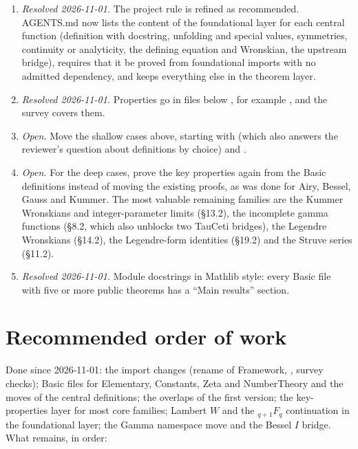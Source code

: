 \documentclass[11pt,a4paper]{article}
\newcommand{\resolved}[1]{\textit{Resolved #1.}}
\newcommand{\open}{\textit{Open.}}
\begin{document}
\begin{enumerate}
  \item \resolved{2026-11-01} The project rule is refined as recommended. AGENTS.md now lists
    the content of the foundational layer for each central function (definition with
    docstring, unfolding and special values, symmetries, continuity or analyticity, the
    defining equation and Wronskian, the upstream bridge), requires that it be proved from
    foundational imports with no admitted dependency, and keeps everything else in the theorem
    layer.
  \item \resolved{2026-11-01} Properties go in files below , for example
    , and the survey covers them.
  \item \open{} Move the shallow cases above, starting with
     (which also answers the reviewer's question about
    definitions by choice) and .
  \item \open{} For the deep cases, prove the key properties again from the Basic definitions
    instead of moving the existing proofs, as was done for Airy, Bessel, Gauss and Kummer. The
    most valuable remaining families are the Kummer Wronskians and integer-parameter limits
    (\S13.2), the incomplete gamma functions (\S8.2, which also unblocks two TauCeti bridges),
    the Legendre Wronskians (\S14.2), the Legendre-form identities (\S19.2) and the Struve
    series (\S11.2).
  \item \resolved{2026-11-01} Module docstrings in Mathlib style: every Basic file with five or
    more public theorems has a ``Main results'' section.
\end{enumerate}

\section{Recommended order of work}

Done since 2026-11-01: the import changes (rename of Framework, , survey
checks); Basic files for Elementary, Constants, Zeta and NumberTheory and the moves of the
central definitions; the overlaps of the first version; the key-properties layer for most core
families; Lambert \(W\) and the \({}_{q+1}F_q\) continuation in the foundational layer; the
Gamma namespace move and the Bessel \(I\) bridge. What remains, in order:
\end{document}
